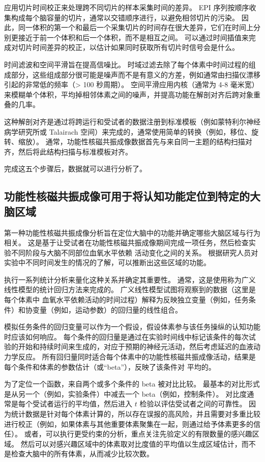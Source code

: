 应用切片时间校正来处理跨不同切片的样本采集时间的差异。
EPI 序列按顺序收集构成每个脑容量的切片，通常以交错顺序进行，以避免相邻切片的污染。
因此，同一体积的第一个和最后一个采集切片的时间存在很大差异，它们在时间上分别更接近于前一个体积和后一个体积，而不是相互之间。
可以通过时间插值来完成对切片时间差异的校正，以估计如果同时获取所有切片时信号会是什么。


时间滤波和空间平滑旨在提高信噪比。
时域过滤去除了每个体素中时间过程的组成部分，这些组成部分很可能是噪声而不是有意义的方差，例如通常由扫描仪漂移引起的非常低的频率（> 100 秒周期）。 
空间平滑应用内核（通常为 4-8 毫米宽）来模糊单个体积，平均掉相邻体素之间的噪声，并提高功能在解剖对齐后跨对象重叠的几率。


这种解剖对齐是通过将跨运行和受试者的数据注册到标准模板（例如蒙特利尔神经病学研究所或 Talairach 空间）来完成的，通常使用简单的转换（例如，移位、旋转、缩放）。 
通常，功能性核磁共振成像数据首先与来自同一主题的结构扫描对齐，然后将此结构扫描与标准模板对齐。


完成这五个步骤后，数据就可以进行分析了。



\subsection{功能性核磁共振成像可用于将认知功能定位到特定的大脑区域}

第一种功能性核磁共振成像分析旨在定位大脑中的功能并确定哪些大脑区域与行为相关。 
这是基于让受试者在功能性核磁共振成像期间完成一项任务，然后检查实验不同阶段与大脑不同部位血氧水平依赖 活动变化之间的关系。 
根据研究人员对实验中不同时间发生的情况的了解，可以推断出这些区域的功能。


执行一系列统计分析来量化这种关系并确定其重要性。 
通常，这是使用称为广义线性模型的统计回归方法来完成的。 
广义线性模型试图将观察到的数据（这里是每个体素中 血氧水平依赖活动的时间过程）解释为反映独立变量（例如，任务条件）和协变量（例如，运动参数）的回归量的线性组合。


模拟任务条件的回归变量可以作为一个假设，假设体素参与该任务操纵的认知功能时应该如何响应。
每个条件的回归量是通过在实验时间线中标记该条件的每次试验的开始和持续时间来生成的，对应于预期的神经元活动，然后考虑延迟的血液动力学反应。
所有回归量同时适合每个体素中的功能性核磁共振成像活动，结果是每个条件和体素的参数估计（或“beta”），反映了该条件对 平均的。


为了定位一个函数，来自两个或多个条件的 beta 被对比比较。 
最基本的对比形式是从另一个（例如，实验条件）中减去一个 beta（例如，控制条件）。 
对比度通常是每个受试者运行的平均值，然后进入 $t$ 检验以评估受试者之间的可靠性。 
因为统计数据是针对每个体素计算的，所以存在误报的高风险，并且需要对多重比较进行校正（例如，如果体素与其他重要体素聚集在一起，则通过给予体素更多的信任）。 
或者，可以执行更受约束的分析，重点关注先验定义的有限数量的感兴趣区域。 
然后可以对感兴趣区域中的体素取对比度值的平均值以生成区域估计，而不是检查大脑中的所有体素，从而减少比较次数。


